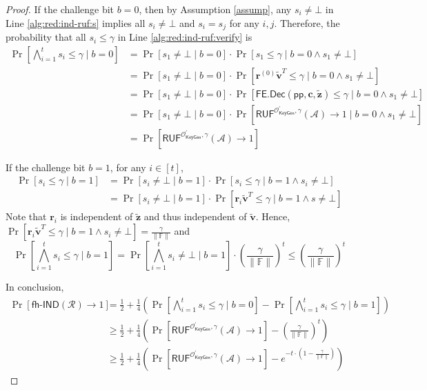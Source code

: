 \begin{proof}
If the challenge bit $b = 0$, then by Assumption \ref{assump}, any $s_i \neq \bot$ in Line \ref{alg:red:ind-ruf:s} implies all $s_i \neq \bot$ and $s_i = s_j$ for any $i, j$. Therefore, the probability that all $s_i \leq \gamma$ in Line \ref{alg:red:ind-ruf:verify} is
\begin{align*}
	\Pr\left[ \bigwedge_{i=1}^t s_i \leq \gamma \mid b = 0 \right]
	&= \Pr\left[ s_1 \neq \bot \mid b = 0 \right] \cdot \Pr \left[ s_1 \leq \gamma \mid b = 0 \wedge s_1 \neq \bot \right] \\
	&= \Pr \left[ s_1 \neq \bot \mid b = 0 \right] \cdot \Pr \left[ \mathbf{r}^{(0)} \mathbf{\tilde{v}}^T \leq \gamma \mid b = 0 \wedge s_1 \neq \bot \right] \\
	&= \Pr \left[s_1 \neq \bot \mid b = 0 \right] \cdot \Pr \left[ \textsf{FE.Dec}(\textsf{pp}, \mathbf{c}, \mathbf{\tilde{z}}) \leq \gamma \mid b = 0 \wedge s_1 \neq \bot \right] \\
	&= \Pr \left[s_1 \neq \bot \mid b = 0 \right] \cdot \Pr \left[ \textsf{RUF}^{\mathcal{O}^\prime_{\textsf{KeyGen}}, \gamma}(\mathcal{A}) \to 1 \mid b = 0 \wedge s_1 \neq \bot \right] \\ 
	&= \Pr \left[ \textsf{RUF}^{\mathcal{O}^\prime_{\textsf{KeyGen}}, \gamma}(\mathcal{A}) \to 1 \right] 
\end{align*}

If the challenge bit $b = 1$, for any $i \in [t]$,
\begin{align*}
	\Pr[ s_i \leq \gamma \mid b = 1 ]
	&= \Pr[s_i \neq \bot \mid b = 1] \cdot \Pr[ s_i \leq \gamma \mid b = 1 \wedge s_i \neq \bot] \\
	&= \Pr[s_i \neq \bot \mid b = 1] \cdot \Pr[ \mathbf{r}_i \mathbf{\tilde{v}}^T \leq \gamma \mid b = 1 \wedge s \neq \bot]
\end{align*}
Note that $\mathbf{r}_i$ is independent of $\mathbf{\tilde{z}}$ and thus independent of $\mathbf{\tilde{v}}$. Hence, $\Pr[\mathbf{r}_i \mathbf{\tilde{v}}^T \leq \gamma \mid b = 1 \wedge s_i \neq \bot] = \frac{\gamma}{\| \mathbb{F} \|}$ and
\[
	\Pr \left[ \bigwedge_{i=1}^t s_i \leq \gamma \mid b = 1 \right] = \Pr \left[ \bigwedge_{i=1}^t s_i \neq \bot \mid b = 1 \right] \cdot \left( \frac{\gamma}{\| \mathbb{F} \|} \right)^t \leq \left( \frac{\gamma}{\| \mathbb{F} \|} \right)^t
\]

In conclusion,
\begin{align*}
	\Pr[\textsf{fh-IND}(\mathcal{R}) \to 1] 
	&= \frac{1}{2} + \frac{1}{4} \left( \Pr \left[ \bigwedge_{i=1}^t s_i \leq \gamma \mid b = 0 \right] - \Pr \left[ \bigwedge_{i=1}^t s_i \leq \gamma \mid b = 1 \right] \right) \\
	&\geq \frac{1}{2} + \frac{1}{4} \left( \Pr[ \textsf{RUF}^{\mathcal{O}^\prime_{\textsf{KeyGen}}, \gamma}(\mathcal{A}) \to 1] - \left( \frac{\gamma}{\| \mathbb{F} \|} \right)^t \right) \\
	&\geq \frac{1}{2} + \frac{1}{4} \left( \Pr[ \textsf{RUF}^{\mathcal{O}^\prime_{\textsf{KeyGen}}, \gamma}(\mathcal{A}) \to 1] -  e^{- t \cdot (1 - \frac{\gamma}{\| \mathbb{F} \|}) } \right)
\end{align*}


\end{proof}
